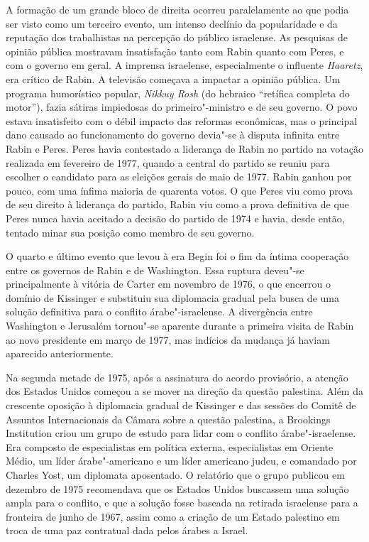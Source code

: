 A formação de um grande bloco de direita ocorreu paralelamente ao que
podia ser visto como um terceiro evento, um intenso declínio da
popularidade e da reputação dos trabalhistas na percepção do público
israelense. As pesquisas de opinião pública mostravam insatisfação tanto
com Rabin quanto com Peres, e com o governo em geral. A imprensa
israelense, especialmente o influente \textit{Haaretz}, era crítico de
Rabin. A televisão começava a impactar a opinião pública. Um programa
humorístico popular, \textit{Nikkuy Rosh} (do hebraico ``retífica completa do
motor''), fazia sátiras impiedosas do primeiro"-ministro e de seu
governo. O povo estava insatisfeito com o débil impacto das reformas
econômicas, mas o principal dano causado ao funcionamento do governo
devia"-se à disputa infinita entre Rabin e Peres. Peres havia contestado
a liderança de Rabin no partido na votação realizada em fevereiro de
1977, quando a central do partido se reuniu para escolher o candidato
para as eleições gerais de maio de 1977. Rabin ganhou por pouco, com uma
ínfima maioria de quarenta votos. O que Peres viu como prova de seu
direito à liderança do partido, Rabin viu como a prova definitiva de que
Peres nunca havia aceitado a decisão do partido de 1974 e havia, desde
então, tentado minar sua posição como membro de seu governo.

O quarto e último evento que levou à era Begin foi o fim da íntima
cooperação entre os governos de Rabin e de Washington. Essa ruptura
deveu"-se principalmente à vitória de Carter em novembro de 1976, o que
encerrou o domínio de Kissinger e substituiu sua diplomacia gradual pela
busca de uma solução definitiva para o conflito árabe"-israelense. A
divergência entre Washington e Jerusalém tornou"-se aparente durante a
primeira visita de Rabin ao novo presidente em março de 1977, mas
indícios da mudança já haviam aparecido anteriormente.

Na segunda metade de 1975, após a assinatura do acordo provisório, a
atenção dos Estados Unidos começou a se mover na direção da questão
palestina. Além da crescente oposição à diplomacia gradual de Kissinger
e das sessões do Comitê de Assuntos Internacionais da Câmara sobre a
questão palestina, a Brookings Institution criou um grupo de estudo para
lidar com o conflito árabe"-israelense. Era composto de especialistas em
política externa, especialistas em Oriente Médio, um líder
árabe"-americano e um líder americano judeu, e comandado por Charles
Yost, um diplomata aposentado. O relatório que o grupo publicou em
dezembro de 1975 recomendava que os Estados Unidos buscassem uma solução
ampla para o conflito, e que a solução fosse baseada na retirada
israelense para a fronteira de junho de 1967, assim como a criação de um
Estado palestino em troca de uma paz contratual dada pelos árabes a
Israel.


